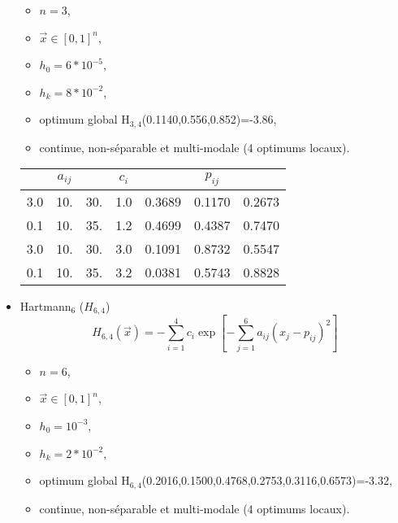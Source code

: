\begin{itemize}
	\begin{itemize}[label={$\circ$}]
		\item $n=$3, 
		\item $\overrightarrow{x} \in [0,1]^n$,
		\item $h_0=6*10^{-5}$,
		\item $h_k=8*10^{-2}$,
		\item optimum global H$_{3,4}$(0.1140,0.556,0.852)=-3.86,
		\item continue, non-séparable et multi-modale (4 optimums locaux).
	\end{itemize}
	
	\bigskip
	
	\begin{table}[H]\centering
		\begin{tabular}{ccc|c|ccc}
			\toprule \textbf{} & \textbf{$a_{ij}$} & \textbf{} & \textbf{$c_i$} & \textbf{} & \textbf{$p_{ij}$}  \\    \midrule
			3.0 & 10. & 30. & 1.0 &0.3689 &0.1170 &0.2673   \\  
			0.1 & 10. & 35. & 1.2 &0.4699 &0.4387 &0.7470   \\ 
			3.0 & 10. & 30. & 3.0 &0.1091 &0.8732 &0.5547   \\
			0.1 & 10. & 35. & 3.2 &0.0381 &0.5743 &0.8828   \\ 
			\bottomrule	
		\end{tabular}
	\end{table}
	\bigskip
	\bigskip
	\item
	Hartmann$_6$ ($H_{6,4}$)\\$$H_{6,4}(\overrightarrow{x})= -\sum_{i=1}^{4} c_i \exp[-\sum_{j=1}^{6}a_{ij}(x_j-p_{ij})^2]$$

	\begin{itemize}[label={$\circ$}]
		\item $n=$6, 
		\item $\overrightarrow{x} \in [0,1]^n$,
		\item $h_0=10^{-3}$,
		\item $h_k=2*10^{-2}$,
		\item optimum global H$_{6,4}$(0.2016,0.1500,0.4768,0.2753,0.3116,0.6573)=-3.32,
		\item continue, non-séparable et multi-modale (4 optimums locaux).
	\end{itemize}

	\bigskip


\end{itemize}

